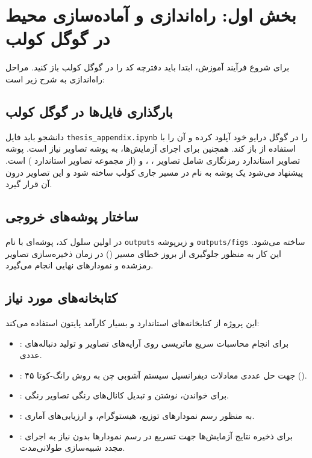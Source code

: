 \chapter{بخش اول: راه‌اندازی و آماده‌سازی محیط در گوگل کولب}
برای شروع فرآیند آموزش، ابتدا باید دفترچه کد را در گوگل کولب باز کنید. مراحل راه‌اندازی به شرح زیر است:

\section{بارگذاری فایل‌ها در گوگل کولب}
دانشجو باید فایل \texttt{thesis\_appendix.ipynb} را در گوگل درایو خود آپلود کرده و آن را با استفاده از  باز کند. همچنین برای اجرای آزمایش‌ها، به پوشه تصاویر نیاز است. 
پوشه تصاویر استاندارد رمزنگاری شامل تصاویر ، ،  و  (از مجموعه تصاویر استاندارد ) است. 
پیشنهاد می‌شود یک پوشه به نام  در مسیر جاری کولب ساخته شود و این تصاویر درون آن قرار گیرد. 

\section{ساختار پوشه‌های خروجی}
در اولین سلول کد، پوشه‌ای با نام \texttt{outputs} و زیرپوشه \texttt{outputs/figs} ساخته می‌شود. این کار به منظور جلوگیری از بروز خطای مسیر () در زمان ذخیره‌سازی تصاویر رمزشده و نمودارهای نهایی انجام می‌گیرد.

\section{کتابخانه‌های مورد نیاز}
این پروژه از کتابخانه‌های استاندارد و بسیار کارآمد پایتون استفاده می‌کند:
\begin{itemize}
    \item {}: برای انجام محاسبات سریع ماتریسی روی آرایه‌های تصاویر و تولید دنباله‌های عددی.
    \item {}: جهت حل عددی معادلات دیفرانسیل سیستم آشوبی چن به روش رانگ-کوتا ۴۵ ().
    \item {}: برای خواندن، نوشتن و تبدیل کانال‌های رنگی تصاویر رنگی.
    \item {}: به منظور رسم نمودارهای توزیع، هیستوگرام، و ارزیابی‌های آماری.
    \item {}: برای ذخیره نتایج آزمایش‌ها جهت تسریع در رسم نمودارها بدون نیاز به اجرای مجدد شبیه‌سازی طولانی‌مدت.
\end{itemize}


